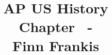 \title{\vspace{-3em}
\begin{tcolorbox}
\Huge\sffamily \begin{center} AP US History  \\
\LARGE Chapter \chapternumber \, - \chaptertitle \\
\Large Finn Frankis \end{center} 
\end{tcolorbox}
\vspace{-3em}
}
\date{}
\author{}